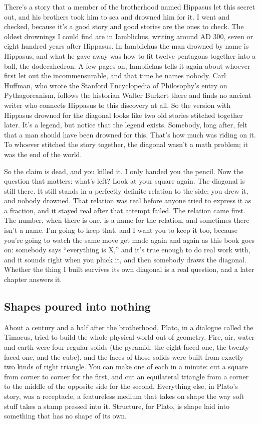 \documentclass[11pt,twoside]{article}
\theoremstyle{thielethm}
\theoremstyle{thieledef}
\theoremstyle{thieledef}
\theoremstyle{thieledef}
\theoremstyle{thielethm}
\theoremstyle{thieleobs}
\theoremstyle{thielethm}
\begin{document}
There's a story that a member of the brotherhood named Hippasus let this secret out, and his brothers took him to sea and drowned him for it. I went and checked, because it's a good story and good stories are the ones to check. The oldest drownings I could find are in Iamblichus, writing around AD 300, seven or eight hundred years after Hippasus. In Iamblichus the man drowned by name is Hippasus, and what he gave away was how to fit twelve pentagons together into a ball, the dodecahedron. A few pages on, Iamblichus tells it again about whoever first let out the incommensurable, and that time he names nobody. Carl Huffman, who wrote the Stanford Encyclopedia of Philosophy's entry on Pythagoreanism, follows the historian Walter Burkert there and finds no ancient writer who connects Hippasus to this discovery at all. So the version with Hippasus drowned for the diagonal looks like two old stories stitched together later. It's a legend, but notice that the legend exists. Somebody, long after, felt that a man should have been drowned for this. That's how much was riding on it. To whoever stitched the story together, the diagonal wasn't a math problem; it was the end of the world.

So the claim is dead, and you killed it. I only handed you the pencil. Now the question that matters: what's left? Look at your square again. The diagonal is still there. It still stands in a perfectly definite relation to the side; you drew it, and nobody drowned. That relation was real before anyone tried to express it as a fraction, and it stayed real after that attempt failed. The relation came first. The number, when there is one, is a name for the relation, and sometimes there isn't a name. I'm going to keep that, and I want you to keep it too, because you're going to watch the same move get made again and again as this book goes on: somebody says ``everything is X,'' and it's true enough to do real work with, and it sounds right when you pluck it, and then somebody draws the diagonal. Whether the thing I built survives its own diagonal is a real question, and a later chapter answers it.

\subsection{Shapes poured into nothing}

About a century and a half after the brotherhood, Plato, in a dialogue called the Timaeus, tried to build the whole physical world out of geometry. Fire, air, water and earth were four regular solids (the pyramid, the eight-faced one, the twenty-faced one, and the cube), and the faces of those solids were built from exactly two kinds of right triangle. You can make one of each in a minute: cut a square from corner to corner for the first, and cut an equilateral triangle from a corner to the middle of the opposite side for the second. Everything else, in Plato's story, was a receptacle, a featureless medium that takes on shape the way soft stuff takes a stamp pressed into it. Structure, for Plato, is shape laid into something that has no shape of its own.
\end{document}
